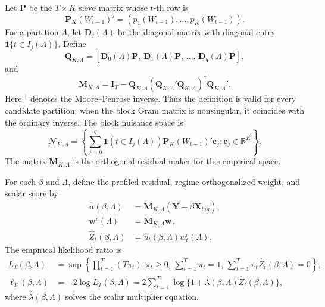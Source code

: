\documentclass[12pt]{article}
\numberwithin{equation}{section}
\theoremstyle{definition}
\newcommand{\ind}{\mathbf 1}
\newcommand{\R}{\mathbb R}
\begin{document}
Let \(\bm P\) be the \(T\times K\) sieve matrix whose \(t\)-th row is
\[
    \bm P_K(W_{t-1})'=(p_1(W_{t-1}),\ldots,p_K(W_{t-1})).
\]
For a partition \(\Lambda\), let \(\bm D_j(\Lambda)\) be the diagonal matrix with diagonal entry \(\ind\{t\in I_j(\Lambda)\}\). Define
\begin{equation}
    \bm Q_{K,\Lambda}
    =
    \left[
    \bm D_0(\Lambda)\bm P,\,
    \bm D_1(\Lambda)\bm P,\,
    \ldots,\,
    \bm D_q(\Lambda)\bm P
    \right],
    \label{eq:block-q}
\end{equation}
and
\begin{equation}
    \bm M_{K,\Lambda}
    =
    \bm I_T
    -
    \bm Q_{K,\Lambda}
    (\bm Q_{K,\Lambda}'\bm Q_{K,\Lambda})^\dagger
    \bm Q_{K,\Lambda}'.
    \label{eq:block-m}
\end{equation}
Here \({}^\dagger\) denotes the Moore--Penrose inverse. Thus the definition
is valid for every candidate partition; when the block Gram matrix is
nonsingular, it coincides with the ordinary inverse.
The block nuisance space is
\[
    \mathcal N_{K,\Lambda}
    =
    \left\{
      \sum_{j=0}^q
      \ind(t\in I_j(\Lambda))\bm P_K(W_{t-1})'\bm c_j:
      \bm c_j\in\R^K
    \right\}.
\]
The matrix \(\bm M_{K,\Lambda}\) is the orthogonal residual-maker for this empirical space.

For each \(\beta\) and \(\Lambda\), define the profiled residual, regime-orthogonalized weight, and scalar score by
\begin{align}
    \widehat{\bm u}(\beta,\Lambda)
    &=
    \bm M_{K,\Lambda}(\bm Y-\beta\bm X_{lag}),
    \label{eq:block-profile-resid}\\
    \bm w^c(\Lambda)
    &=
    \bm M_{K,\Lambda}\bm w,
    \label{eq:block-weight}\\
    \widehat Z_t(\beta,\Lambda)
    &=
    \widehat u_t(\beta,\Lambda)w_t^c(\Lambda).
    \label{eq:block-score}
\end{align}
The empirical likelihood ratio is
\begin{align}
    L_T(\beta,\Lambda)
    &=
    \sup
    \left\{
    \prod_{t=1}^T(T\pi_t):
    \pi_t\geq0,\,
    \sum_{t=1}^T\pi_t=1,\,
    \sum_{t=1}^T\pi_t\widehat Z_t(\beta,\Lambda)=0
    \right\},
    \label{eq:block-el}\\
    \ell_T(\beta,\Lambda)
    &=
    -2\log L_T(\beta,\Lambda)
    =
    2\sum_{t=1}^T
    \log\{1+\widehat\lambda(\beta,\Lambda)\widehat Z_t(\beta,\Lambda)\},
    \label{eq:block-elr}
\end{align}
where \(\widehat\lambda(\beta,\Lambda)\) solves the scalar multiplier equation.
\end{document}
